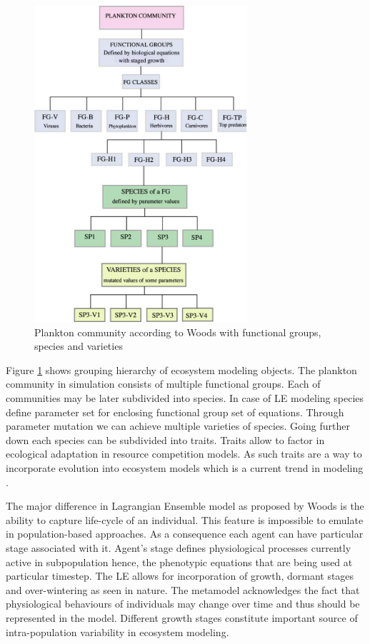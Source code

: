 \documentclass[12pt, a4paper]{report}
\begin{document}
\begin{figure}[H]
  \centering
  \includegraphics[width=0.7\textwidth,natwidth=744,natheight=1109]{images/fg.jpg}
  \caption{Plankton community according to Woods \cite{Woods2005}
    with functional groups, species and varieties}
  \label{fig:fg}
\end{figure}

Figure \ref{fig:fg} shows grouping hierarchy of ecosystem modeling
objects. The plankton community in simulation consists of multiple functional
groups. Each of communities may be later subdivided into species. In case of
LE modeling species define parameter set for enclosing functional group set of
equations. Through parameter mutation we can achieve multiple varieties of
species. Going further down each species can be subdivided into traits.
Traits allow to factor in ecological adaptation in resource competition models.
As such traits are a way to incorporate evolution into ecosystem models
which is a current trend in modeling \cite{Clark20113823}.

The major difference in Lagrangian Ensemble model as proposed by Woods
\cite{Woods2005} is the ability to capture life-cycle of an individual. This
feature is impossible to emulate in population-based approaches. As a
consequence each agent can have particular stage associated with it. Agent's
stage defines physiological processes currently active in subpopulation hence,
the phenotypic equations that are being used at particular timestep. The LE
allows for incorporation of growth, dormant stages and over-wintering as
seen in nature. The metamodel acknowledges the fact that physiological
behaviours of individuals may change over time and thus should be represented
in the model. Different growth stages constitute important source of intra-population
variability in ecosystem modeling.
\end{document}
